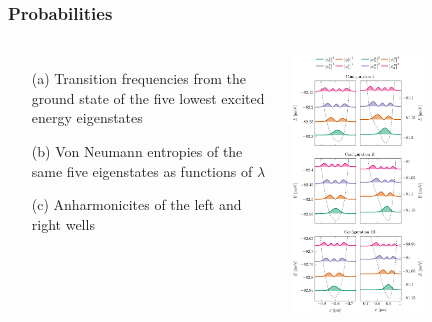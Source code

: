 \documentclass{beamer}
\begin{document}
\frame
    {
      \frametitle{Probabilities}
	
      \begin{footnotesize}
     \begin{columns}
       \column{5.0cm}
\begin{itemize}
\item[(a)] Transition frequencies from the ground state of the five lowest excited energy eigenstates

\item[(b)] Von Neumann entropies of the same five eigenstates as functions of $\lambda$

\item[(c)] Anharmonicites of the left and right wells 
\end{itemize}

\column{6cm}
      \begin{center}
	\includegraphics[width=0.6\textwidth]{qcfigures/probability.pdf}
      \end{center}
\end{columns}
      \end{footnotesize}
    }
\end{document}
